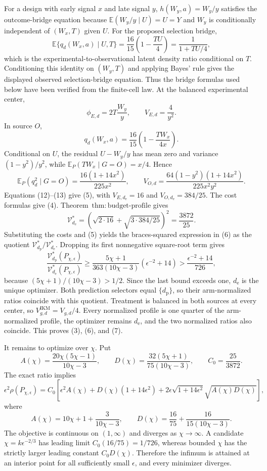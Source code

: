 For a design with early signal \(x\) and late signal \(y\), \(h(W_y,a)=W_y/y\) satisfies the outcome-bridge equation because \(\mathbb E(W_y/y\mid U)=U=Y\) and \(W_y\) is conditionally independent of \((W_x,T)\) given \(U\).  For the proposed selection bridge,
\[
 \mathbb E\{q_d(W_x,a)\mid U,T\}
 =\frac{16}{15}\left(1-\frac{TU}{4}\right)
 =\frac1{1+TU/4},
\]
which is the experimental-to-observational latent density ratio conditional on \(T\).  Conditioning this identity on \((W_y,T)\) and applying Bayes' rule gives the displayed observed selection-bridge equation.  Thus the bridge formulas used below have been verified from the finite-cell law.  At the balanced experimental center,
\[
 \phi_{E,d}=2T\frac{W_y}{y},
 \qquad V_{E,d}=\frac4{y^2}.                                                    \tag{12}
\]
In source \(O\),
\[
 q_d(W_x,a)=\frac{16}{15}\left(1-\frac{TW_x}{4x}\right).
\]
Conditional on \(U\), the residual \(U-W_y/y\) has mean zero and variance \((1-y^2)/y^2\), while \(\mathbb E_P(TW_x\mid G=O)=x/4\).  Hence
\[
 \mathbb E_P(q_d^2\mid G=O)=\frac{16(1+14x^2)}{225x^2},
 \qquad
 V_{O,d}=\frac{64(1-y^2)(1+14x^2)}{225x^2y^2}.                 \tag{13}
\]
Equations (12)--(13) give (5), with \(V_{E,d_{\mathrm e}}=16\) and \(V_{O,d_{\mathrm e}}=384/25\).  The cost formulas give (4).  Theorem~\(\mathrm{thm{:}budget\text{-}profile}\) gives
\[
 \mathcal V_{d_{\mathrm e}}^*
 =\left(\sqrt{2\cdot16}+\sqrt{3\cdot384/25}\right)^2
 =\frac{3872}{25}.
\]
Substituting the costs and (5) yields the braces-squared expression in (6) as the quotient \(\mathcal V_{d_{\mathrm p}}^*/\mathcal V_{d_{\mathrm e}}^*\).  Dropping its first nonnegative square-root term gives
\[
 \frac{\mathcal V_{d_{\mathrm p}}^*(P_{\chi,\epsilon})}
 {\mathcal V_{d_{\mathrm e}}^*(P_{\chi,\epsilon})}
 \ge \frac{5\chi+1}{363(10\chi-3)}(\epsilon^{-2}+14)
 >\frac{\epsilon^{-2}+14}{726},                             \tag{14}
\]
because \((5\chi+1)/(10\chi-3)>1/2\).  Since the last bound exceeds one, \(d_{\mathrm e}\) is the unique optimizer.  Both prediction selectors equal \(\{d_{\mathrm p}\}\), so their arm-normalized ratios coincide with this quotient.  Treatment is balanced in both sources at every center, so \(V_{g,d}^{\mathrm{IKM}}=V_{g,d}/4\).  Every normalized profile is one quarter of the arm-normalized profile, the optimizer remains \(d_{\mathrm e}\), and the two normalized ratios also coincide.  This proves (3), (6), and (7).

It remains to optimize over \(\chi\).  Put
\[
 A(\chi)=\frac{20\chi(5\chi-1)}{10\chi-3},
 \qquad
 D(\chi)=\frac{32(5\chi+1)}{75(10\chi-3)},
 \qquad C_0=\frac{25}{3872}.
\]
The exact ratio implies
\[
 \epsilon^2\rho(P_{\chi,\epsilon})
 =C_0\left[\epsilon^2A(\chi)+D(\chi)(1+14\epsilon^2)
 +2\epsilon\sqrt{1+14\epsilon^2}\sqrt{A(\chi)D(\chi)}\right],               \tag{15}
\]
where
\[
 A(\chi)=10\chi+1+\frac3{10\chi-3},
 \qquad
 D(\chi)=\frac{16}{75}+\frac{16}{15(10\chi-3)}.                              \tag{16}
\]
The objective is continuous on \((1,\infty)\) and diverges as \(\chi\to\infty\).  A candidate \(\chi=k\epsilon^{-2/3}\) has leading limit \(C_0(16/75)=1/726\), whereas bounded \(\chi\) has the strictly larger leading constant \(C_0D(\chi)\).  Therefore the infimum is attained at an interior point for all sufficiently small \(\epsilon\), and every minimizer diverges.

